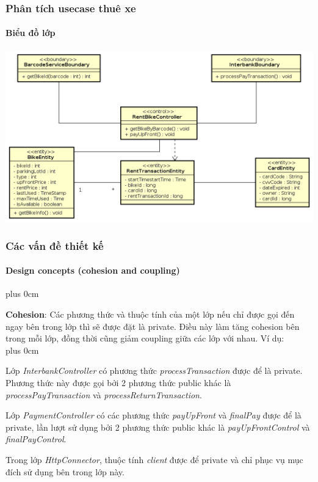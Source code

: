 \documentclass[11pt]{beamer}
\renewcommand{\raggedright}{\leftskip=0pt \rightskip=0pt plus 0cm}
\let\olditemize=\itemize
\renewenvironment{itemize}{\olditemize\raggedright}{\endlist}
\begin{document}
\begin{frame}[plain]
	\frametitle{Phân tích usecase thuê xe}
	\framesubtitle{Biểu đồ lớp}
	\hspace*{-.1 in}\includegraphics[scale=.4]{Images/RentBikeClass.png}
\end{frame}
\begin{frame}[plain]
	\frametitle{Các vấn đề thiết kế}
	\framesubtitle{Design concepts (cohesion and coupling)}
	\begin{itemize}
		\item \textbf{Cohesion}: Các phương thức và thuộc tính của một lớp nếu chỉ được gọi đến ngay bên trong lớp thì sẽ được đặt là private. Điều này làm tăng cohesion bên trong mỗi lớp, đồng thời cũng giảm coupling giữa các lớp với nhau. Ví dụ:\\[10pt]
		\begin{itemize}
			\item Lớp \textit{InterbankController} có phương thức \textit{processTransaction} được để là private. Phương thức này được gọi bởi 2 phương thức public khác là \textit{processPayTransaction} và \textit{processReturnTransaction}.\\[5pt]
			\item Lớp \textit{PaymentController} có các phương thức \textit{payUpFront} và \textit{finalPay} được để là private, lần lượt sử dụng bởi 2 phương thức public khác là \textit{payUpFrontControl} và \textit{finalPayControl}.\\[5pt]
			\item Trong lớp \textit{HttpConnector}, thuộc tính \textit{client} được để private và chỉ phục vụ mục đích sử dụng bên trong lớp này.
		\end{itemize}
	\end{itemize}
\end{frame}
\end{document}

